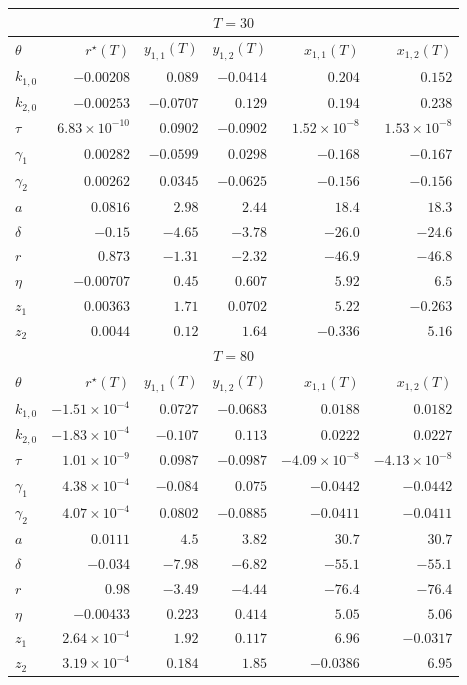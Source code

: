 \begin{tabular}{lrrrrr}
\toprule
\multicolumn{6}{c}{$T = 30$} \\
\midrule
$\theta$ & $r^{\star}(T)$ & $y_{1,1}(T)$ & $y_{1,2}(T)$ & $x_{1,1}(T)$ & $x_{1,2}(T)$ \\
\midrule
$k_{1,0}$ & $-0.00208$ & $0.089$ & $-0.0414$ & $0.204$ & $0.152$ \\
$k_{2,0}$ & $-0.00253$ & $-0.0707$ & $0.129$ & $0.194$ & $0.238$ \\
$\tau$ & $6.83 \times 10^{-10}$ & $0.0902$ & $-0.0902$ & $1.52 \times 10^{-8}$ & $1.53 \times 10^{-8}$ \\
$\gamma_1$ & $0.00282$ & $-0.0599$ & $0.0298$ & $-0.168$ & $-0.167$ \\
$\gamma_2$ & $0.00262$ & $0.0345$ & $-0.0625$ & $-0.156$ & $-0.156$ \\
$a$ & $0.0816$ & $2.98$ & $2.44$ & $18.4$ & $18.3$ \\
$\delta$ & $-0.15$ & $-4.65$ & $-3.78$ & $-26.0$ & $-24.6$ \\
$r$ & $0.873$ & $-1.31$ & $-2.32$ & $-46.9$ & $-46.8$ \\
$\eta$ & $-0.00707$ & $0.45$ & $0.607$ & $5.92$ & $6.5$ \\
$z_1$ & $0.00363$ & $1.71$ & $0.0702$ & $5.22$ & $-0.263$ \\
$z_2$ & $0.0044$ & $0.12$ & $1.64$ & $-0.336$ & $5.16$ \\
\midrule
\multicolumn{6}{c}{$T = 80$} \\
\midrule
$\theta$ & $r^{\star}(T)$ & $y_{1,1}(T)$ & $y_{1,2}(T)$ & $x_{1,1}(T)$ & $x_{1,2}(T)$ \\
\midrule
$k_{1,0}$ & $-1.51 \times 10^{-4}$ & $0.0727$ & $-0.0683$ & $0.0188$ & $0.0182$ \\
$k_{2,0}$ & $-1.83 \times 10^{-4}$ & $-0.107$ & $0.113$ & $0.0222$ & $0.0227$ \\
$\tau$ & $1.01 \times 10^{-9}$ & $0.0987$ & $-0.0987$ & $-4.09 \times 10^{-8}$ & $-4.13 \times 10^{-8}$ \\
$\gamma_1$ & $4.38 \times 10^{-4}$ & $-0.084$ & $0.075$ & $-0.0442$ & $-0.0442$ \\
$\gamma_2$ & $4.07 \times 10^{-4}$ & $0.0802$ & $-0.0885$ & $-0.0411$ & $-0.0411$ \\
$a$ & $0.0111$ & $4.5$ & $3.82$ & $30.7$ & $30.7$ \\
$\delta$ & $-0.034$ & $-7.98$ & $-6.82$ & $-55.1$ & $-55.1$ \\
$r$ & $0.98$ & $-3.49$ & $-4.44$ & $-76.4$ & $-76.4$ \\
$\eta$ & $-0.00433$ & $0.223$ & $0.414$ & $5.05$ & $5.06$ \\
$z_1$ & $2.64 \times 10^{-4}$ & $1.92$ & $0.117$ & $6.96$ & $-0.0317$ \\
$z_2$ & $3.19 \times 10^{-4}$ & $0.184$ & $1.85$ & $-0.0386$ & $6.95$ \\
\bottomrule
\end{tabular}
